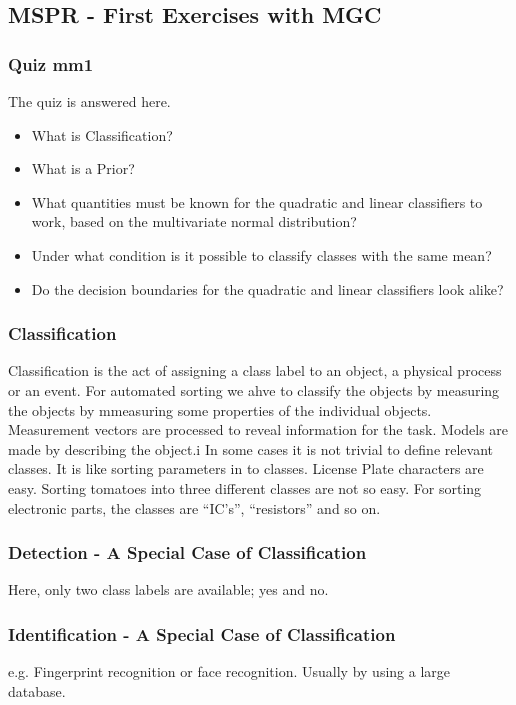 \subsection{MSPR - First Exercises with MGC}
\subsubsection{Quiz mm1}
\label{sub:Quiz_mm1}
The quiz is answered here.
\begin{itemize}
    \item What is Classification?
    \item What is a Prior?
    \item What quantities must be known for the quadratic and linear classifiers to work, based on the multivariate normal distribution?
    \item Under what condition is it possible to classify classes with the same mean?
    \item Do the decision boundaries for the quadratic and linear classifiers look alike?
\end{itemize}
%
\subsubsection{Classification}
\label{sec:Classification}
Classification is the act of assigning a class label to an object, a physical process or an event. For automated sorting we ahve to classify the objects by measuring the objects by mmeasuring some properties of the individual objects.\\ 
Measurement vectors are processed to reveal information for the task. Models are made by describing the object.i
In some cases it is not trivial to define relevant classes.
It is like sorting parameters in to classes.
License Plate characters are easy. Sorting tomatoes into three different classes are not so easy.
For sorting electronic parts, the classes are ``IC's'', ``resistors'' and so on. \\
\subsubsection{Detection - A Special Case of Classification}
Here, only two class labels are available; yes and no.
\subsubsection{Identification - A Special Case of Classification}
e.g. Fingerprint recognition or face recognition. 
Usually by using a large database.



